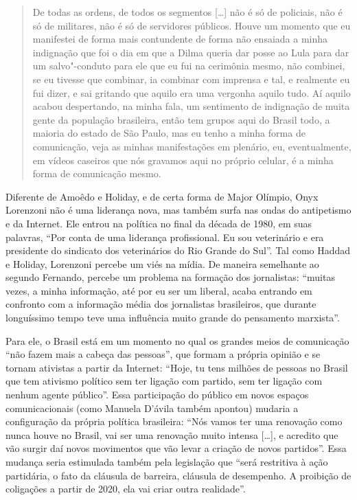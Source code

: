 \begin{quote}
De todas as ordens, de todos os segmentos {[}\ldots{}{]} não é só de
policiais, não é só de militares, não é só de servidores públicos. Houve
um momento que eu manifestei de forma mais contundente de forma não
ensaiada a minha indignação que foi o dia em que a Dilma queria dar
posse ao Lula para dar um salvo"-conduto para ele que eu fui na cerimônia
mesmo, não combinei, se eu tivesse que combinar, ia combinar com
imprensa e tal, e realmente eu fui dizer, e sai gritando que aquilo era
uma vergonha aquilo tudo. Aí aquilo acabou despertando, na minha fala,
um sentimento de indignação de muita gente da população brasileira,
então tem grupos aqui do Brasil todo, a maioria do estado de São Paulo,
mas eu tenho a minha forma de comunicação, veja as minhas manifestações
em plenário, eu, eventualmente, em vídeos caseiros que nós gravamos aqui
no próprio celular, é a minha forma de comunicação mesmo.
\end{quote}

Diferente de Amoêdo e Holiday, e de certa forma de Major Olímpio, Onyx
Lorenzoni não é uma liderança nova, mas também surfa nas ondas do
antipetismo e da Internet. Ele entrou na política no final da década de
1980, em suas palavras, ``Por conta de uma liderança profissional. Eu
sou veterinário e era presidente do sindicato dos veterinários do Rio
Grande do Sul''. Tal como Haddad e Holiday, Lorenzoni percebe um viés na
mídia. De maneira semelhante ao segundo Fernando, percebe um problema na
formação dos jornalistas: ``muitas vezes, a minha informação, até por eu
ser um liberal, acaba entrando em confronto com a informação média dos
jornalistas brasileiros, que durante longuíssimo tempo teve uma
influência muito grande do pensamento marxista''.

Para ele, o Brasil está em um momento no qual os grandes meios de
comunicação ``não fazem mais a cabeça das pessoas'', que formam a
própria opinião e se tornam ativistas a partir da Internet: ``Hoje, tu
tens milhões de pessoas no Brasil que tem ativismo político sem ter
ligação com partido, sem ter ligação com nenhum agente público''. Essa
participação do público em novos espaços comunicacionais (como Manuela
D'ávila também apontou) mudaria a configuração da própria política
brasileira: ``Nós vamos ter uma renovação como nunca houve no Brasil,
vai ser uma renovação muito intensa {[}\ldots{}{]}, e acredito que vão surgir
daí novos movimentos que vão levar a criação de novos partidos''. Essa
mudança seria estimulada também pela legislação que ``será restritiva à
ação partidária, o fato da cláusula de barreira, cláusula de desempenho.
A proibição de coligações a partir de 2020, ela vai criar outra
realidade''.

